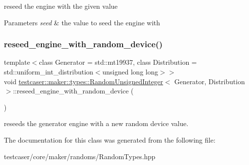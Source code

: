 reseed the engine with the given value 


\begin{DoxyParams}{Parameters}
{\em seed} & the value to seed the engine with \\
\hline
\end{DoxyParams}
\mbox{\label{classtestcaser_1_1maker_1_1types_1_1RandomUnsignedInteger_acd7ff23154cf792b11d8344d091100fe}} 
\subsubsection{\texorpdfstring{reseed\_engine\_with\_random\_device()}{reseed\_engine\_with\_random\_device()}}
{\footnotesize\ttfamily template$<$class Generator = std\+::mt19937, class Distribution = std\+::uniform\+\_\+int\+\_\+distribution$<$unsigned long long$>$$>$ \\
void \mbox{\hyperlink{classtestcaser_1_1maker_1_1types_1_1RandomUnsignedInteger}{testcaser\+::maker\+::types\+::\+Random\+Unsigned\+Integer}}$<$ Generator, Distribution $>$\+::reseed\+\_\+engine\+\_\+with\+\_\+random\+\_\+device (\begin{DoxyParamCaption}{ }\end{DoxyParamCaption})\hspace{0.3cm}{\ttfamily [inline]}}



reseeds the generator engine with a new random device value. 



The documentation for this class was generated from the following file\+:\begin{DoxyCompactItemize}
\item 
testcaser/core/maker/randoms/Random\+Types.\+hpp\end{DoxyCompactItemize}
